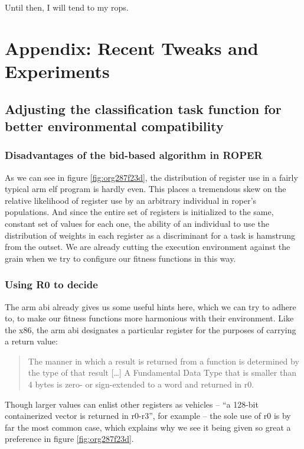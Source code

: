 \documentclass[12pt,glossary]{dalthesis}
\begin{document}
Until then, I will tend to my \glspl{rop}.


\appendix
\chapter{Appendix: Recent Tweaks and Experiments}
\label{sec:org8fd144e}
\section{Adjusting the classification task function for better environmental compatibility}
\label{sec:orgedab1bf}
\subsection{Disadvantages of the bid-based algorithm in ROPER}
\label{sec:orgcb1b630}
As we can see in figure \ref{fig:org287f23d}, the distribution of register use
in a fairly typical \gls{arm} \gls{elf} program is hardly even. This places a tremendous skew
on the relative likelihood of register use by an arbitrary individual in \gls{roper}'s
populations. And since the entire set of registers is initialized to the same, constant
set of values for each one, the ability of an individual to use the distribution of weights
in each register as a discriminant for a task is hamstrung from the outset. We are already
cutting the execution environment against the grain when we try to configure our
fitness functions in this way.
\subsection{Using R0 to decide}
\label{sec:org9d0152b}
\label{org251dd5f}
The \gls{arm} \gls{abi} \cite{arm_abi} already gives us some useful hints here, which we can try to adhere to, to
make our fitness functions more harmonious with their environment. Like the x86, the \gls{arm}
\gls{abi} designates a particular register for the purposes of carrying a return value:
\begin{quote}
The manner in which a result is returned from a function is determined by the type of that
result [\ldots{}] A Fundamental Data Type that is smaller than 4 bytes is zero- or sign-extended
to a word and returned in r0.
\end{quote}
Though larger values can enlist other registers as vehicles -- ``a 128-bit containerized vector
is returned in r0-r3'', for example -- the sole use of r0 is by far the most common case, which
explains why we see it being given so great a preference in figure \ref{fig:org287f23d}. 
\end{document}
